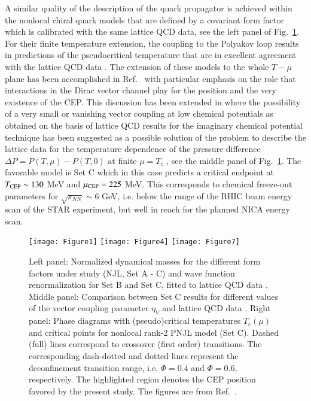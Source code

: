 \documentclass{webofc}
\begin{document}
A similar quality of the description of the quark propagator is achieved within the nonlocal chiral quark models that are defined by a covariant form factor which is calibrated with the same lattice QCD data,
see the left panel of Fig.~\ref{fig-1}.
For their finite temperature extension, the coupling to the Polyakov loop results in predictions of the pseudocritical temperature that are in excellent agreement with the lattice QCD data
\cite{Horvatic:2010md,Radzhabov:2010dd}. 
The extension of these models to the whole $T-\mu$ plane has been accomplished in 
Ref.~\cite{Contrera:2012wj} with particular emphasis on the role that interactions in the Dirac vector channel play for the position and the very existence of the CEP. 
This discussion has been extended in \cite{7} where the possibility of a very small or vanishing vector coupling at low chemical potentials as obtained on the basis of lattice QCD results for the imaginary chemical potential technique has been suggested as a possible solution of the problem to describe the lattice data for the temperature dependence of the pressure difference 
$\Delta P=P(T,\mu)-P(T,0)$ at finite $\mu=T_c$ \cite{Allton:2003vx}, see the middle panel of Fig.~\ref{fig-1}. 
The favorable model is Set C which in this case predicts a critical endpoint  at $T_{\rm CEP}\sim 130$ MeV and $\mu_{\rm CEP}=225$ MeV. 
This corresponds to chemical freeze-out parameters for $\sqrt{s_{NN}}\sim 6$ GeV, i.e. below the range of the RHIC beam energy scan of the STAR experiment, but well in reach for the planned NICA energy scan.
    
\begin{figure}[!t]
\centering
\texttt{[image: Figure1]}
\texttt{[image: Figure4]}
\texttt{[image: Figure7]}
\caption{Left panel: 
Normalized dynamical masses for the different form factors under study (NJL, Set A - C) and wave
function renormalization for Set B and Set C, fitted to lattice QCD data \cite{Parappilly:2005ei}.
Middle panel:
Comparison between Set C  results for different
values of the vector coupling parameter $\eta_V$ and lattice QCD data \cite{Allton:2003vx}.
Right panel:
Phase diagrams with (pseudo)critical temperatures $T_c(\mu)$ and critical points for nonlocal rank-2 PNJL model (Set C).
Dashed (full) lines correspond to crossover (first order) transitions. The corresponding dash-dotted and
dotted lines represent the deconfinement transition range, i.e. $\Phi=0.4$ and $\Phi=0.6$, respectively.
The highlighted region denotes the CEP position favored by the present
study.
The figures %
are from Ref.~\cite{7}.
}
\label{fig-1}       %
\end{figure}
\end{document}
